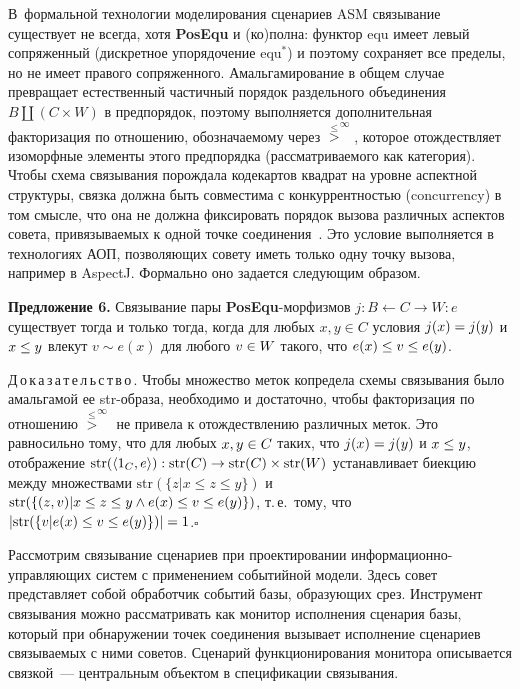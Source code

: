 \begin{multicols}{2}
   В~формальной технологии моделирования сценариев ASM связывание 
существует не всегда, хотя \textbf{PosEqu} и (ко)полна: функтор equ имеет 
левый сопряженный (дискретное упорядочение $\mathrm{equ}^*$) и поэтому сохраняет 
все пределы, но не имеет правого сопряженного. Амальгамирование в общем 
случае превращает естественный частичный порядок раздельного объединения 
$B\amalg (C \times W)$ в предпорядок, поэтому выполняется дополнительная 
факторизация по отношению, обозначаемому через ${\overset{\leq}{>}}^\infty$, 
которое отождествляет изоморфные элементы этого предпорядка 
(рассматриваемого как категория). Чтобы схема связывания порождала 
кодекартов квадрат на уровне аспектной структуры, связка должна быть 
совместима с конкуррентностью (concurrency) в том смысле, что она не должна 
фиксировать порядок вызова различных аспектов совета, привязываемых к 
одной точке соединения~\cite{20-kov}. Это условие выполняется в технологиях 
АОП, позволяющих совету иметь только одну точку вызова, например в 
AspectJ. Формально оно задается следующим образом.
  
  \bigskip
  
  \noindent
  \textbf{Предложение 6.} Связывание пары \textbf{PosEqu}-мор\-физ\-мов $j 
: B \leftarrow C \rightarrow W : e$ существует тогда и только тогда, когда для 
любых $x, y \in C$ условия $j(x) \hm= j(y)$ и $x \hm\leq y$ влекут $v \sim  e(x)$ 
для любого $v\hm\in W$ такого, что $e(x) \hm\leq v \hm\leq e(y)$.
  
  \medskip
  
  \noindent
  Д\,о\,к\,а\,з\,а\,т\,е\,л\,ь\,с\,т\,в\,о\,. Чтобы множество меток копреде\-ла схемы 
связывания было амальгамой ее str-об\-ра\-за, необходимо и достаточно, чтобы 
факторизация по отношению ${\overset{\leq}{>}}^\infty$ не привела к 
отождествлению различных меток. Это равносильно тому, что для любых $x, y 
\hm\in C$ таких, что $j(x) \hm= j(y)$ и $x\hm\leq y$, отображение $\mathrm{str}(\langle 
1_C, e\rangle) : \mathrm{str}(C) \hm\rightarrow \mathrm{str}(C) \times \mathrm{str}(W)$ устанавливает биекцию 
между множествами $\mathrm{str}(\{z\vert  x \leq z \leq y\})$ и $\mathrm{str}(\{(z, v) \vert x 
\hm\leq z \hm\leq y \wedge e(x) \hm\leq v \hm\leq e(y)\})$, т.\,е.\ тому, что $\vert 
\mathrm{str}(\{v \vert  e(x) \hm\leq v \hm\leq e(y)\})\vert  = 1$.\hfill$\square$
   
   \medskip
   
   Рассмотрим связывание сценариев при проектировании 
   ин\-фор\-ма\-ци\-он\-но-управ\-ля\-ющих сис\-тем с применением 
событийной модели. Здесь совет представляет собой обработчик событий базы, 
образующих срез. Инструмент связывания можно рассматривать как монитор 
исполнения сценария базы, который при обнаружении точек соединения 
вызывает исполнение сценариев связываемых с ними советов. Сценарий 
функционирования монитора описывается связкой~--- центральным объектом в 
спецификации связывания. 


\end{multicols}
